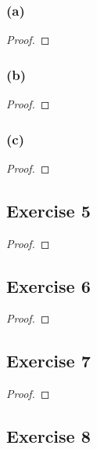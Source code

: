 \documentclass[14pt]{extarticle}
\begin{document}
\subsubsection{(a)}

\begin{proof}

\end{proof}

\subsubsection{(b)}

\begin{proof}

\end{proof}

\subsubsection{(c)}

\begin{proof}

\end{proof}

\subsection{Exercise 5}

\begin{proof}

\end{proof}

\subsection{Exercise 6}

\begin{proof}

\end{proof}

\subsection{Exercise 7}

\begin{proof}

\end{proof}

\subsection{Exercise 8}
\end{document}
